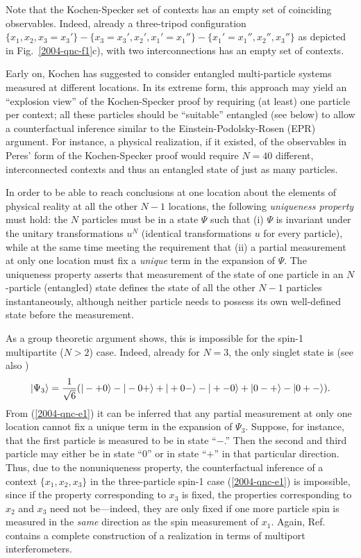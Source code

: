 \documentclass[prl,twocolumn,showpacs,showkeys,amsfonts]{revtex4}
\begin{document}

Note that the Kochen-Specker set of contexts has an empty set of coinciding observables.
Indeed, already a three-tripod configuration
$\{x_1,x_2,x_3=x_3'\}-\{x_3=x_3',x_2',x_1'=x_1''\}-\{x_1'=x_1'',x_2'',x_3''\}$
as depicted in Fig.~\ref{2004-qnc-f1}c),
with two interconnections has an empty set of contexts.

Early on, Kochen \cite{hey-red} has suggested
to consider entangled multi-particle systems measured at different locations.
In its extreme form, this approach may yield an ``explosion view'' of the
Kochen-Specker proof
by requiring (at least) one particle per context;
all these particles should be ``suitable'' entangled (see below)
to allow a counterfactual inference
similar to the Einstein-Podolsky-Rosen (EPR) argument.
For
instance, a physical realization,
if it existed, of the observables in Peres' form
of the Kochen-Specker proof \cite{peres,svozil-tkadlec}
would require $N=40$ different, interconnected contexts and thus
an entangled state of just as many particles.

In order to be able to reach conclusions at
one location about the elements of physical reality \cite{epr}
at all the other $N-1$ locations,
the following {\em uniqueness property} must hold:
the $N$ particles must be in a state  $\Psi$
such that
(i) $\Psi$ is invariant under the unitary transformations $u^N$
(identical transformations $u$ for every particle),
while at the same time meeting the requirement that
(ii) a partial measurement at only one location must
fix a {\em unique} term in the expansion of $\Psi$.
The uniqueness property asserts that measurement of the state of one particle in an $N$-particle
(entangled) state defines
the state of  all the other $N-1$ particles instantaneously,
although neither particle needs to possess its own well-defined state before the measurement.

As a group theoretic argument \cite{2004-kasper-svo} shows,
this is impossible
for the spin-1 multipartite ($N>2$) case.
Indeed, already for $N=3$, the only singlet state  is (see also \cite{kok-02})
\begin{equation}
\vert \Psi_3 \rangle
= {1\over \sqrt{6}}(
\vert - + 0\rangle
-
\vert - 0 +\rangle
+
\vert + 0 - \rangle
-
\vert + - 0\rangle
+
\vert 0 - + \rangle
-
\vert 0 + - \rangle
).
\label{2004-qnc-e1}
\end{equation}
From (\ref{2004-qnc-e1}) it can be inferred that
any partial measurement at only one location cannot
fix a  unique term in the expansion of $\Psi_3$.
Suppose, for instance, that the first particle is measured to be in state
``$-$.'' Then the second and third particle may either be in state ``$0$'' or in state ``$+$''
in that particular direction.
Thus, due to the nonuniqueness property, the counterfactual inference of a context $\{x_1,x_2,x_3\}$ in the three-particle spin-1
case (\ref{2004-qnc-e1}) is impossible,
since if the property corresponding to $x_3$ is fixed,
the properties corresponding to $x_2$ and $x_3$ need not be---indeed,
they are only fixed if one more particle spin is measured in the {\em same}
direction as the spin measurement of $x_1$.
Again, Ref.~\cite{svozil-2004-analog} contains a complete construction of a
realization in terms of multiport interferometers.
\end{document}
